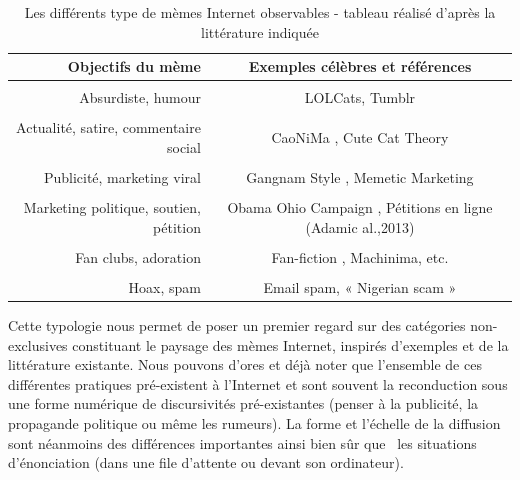 \begin{table}
    \centering
    \begin{tabulary}{\textwidth}{ R | C}
    \textbf{Objectifs du mème}  & \textbf{Exemples célèbres et références} \\[0.2ex]
    \hline \\ [-1.5ex]
    Absurdiste, humour &  LOLCats, Tumblr \citep{Bauckhage2011} \\[0.3ex]
    \hline \\ [-1.5ex]
    Actualité, satire, commentaire social  & CaoNiMa \citep{Mina2012}, Cute Cat Theory \citep{Zuckerman2008} \\[0.3ex]
    \hline \\ [-1.5ex]
    Publicité, marketing viral & Gangnam Style \citep{Bolsover2013}, Memetic Marketing \citep{Flor2000} \\[0.3ex]
    \hline \\ [-1.5ex]
    Marketing politique, soutien, pétition & Obama Ohio Campaign \citep{Walker2012}, Pétitions en ligne (Adamic al.,2013) \\[0.3ex]
    \hline \\ [-1.5ex]
    Fan clubs, adoration  &  Fan-fiction , Machinima, etc. \\[0.3ex]
    \hline \\ [-1.5ex]
    Hoax, spam & Email spam, « Nigerian scam » \\[0.3ex]
    \end{tabulary}

\caption[Typologie des mèmes]{Les différents type de mèmes Internet observables - tableau réalisé d{\textquoteright}après la littérature indiquée}
\label{fig:typologie-memes}

\end{table}


Cette typologie nous permet de poser un premier regard sur des catégories non-exclusives constituant le paysage des mèmes Internet, inspirés d{\textquoteright}exemples et de la littérature existante. Nous pouvons d{\textquoteright}ores et déjà noter que l{\textquoteright}ensemble de ces différentes pratiques pré-existent à l{\textquoteright}Internet et sont souvent la reconduction sous une forme numérique de discursivités pré-existantes (penser à la publicité, la propagande politique ou même les rumeurs). La forme et l{\textquoteright}échelle de la diffusion sont néanmoins des différences importantes ainsi bien s\^ur que \ les situations d{\textquoteright}énonciation (dans une file d{\textquoteright}attente ou devant son ordinateur). 

